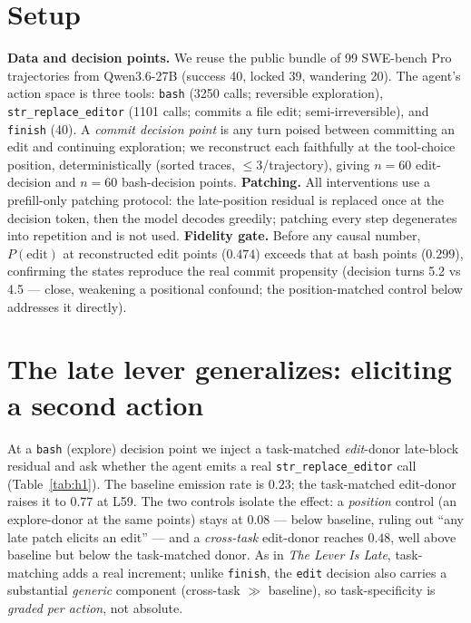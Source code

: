 \documentclass[11pt]{article}
\begin{document}
\section{Setup}\label{sec:setup}
\noindent\textbf{Data and decision points.} We reuse the public bundle of 99 SWE-bench Pro~\cite{swebench}
trajectories from Qwen3.6-27B (success 40, locked 39, wandering 20). The agent's action space is three tools:
\texttt{bash} (3250 calls; reversible exploration), \texttt{str\_replace\_editor} (1101 calls; commits a file
edit; semi-irreversible), and \texttt{finish} (40). A \emph{commit decision point} is any turn poised between
committing an edit and continuing exploration; we reconstruct each faithfully at the tool-choice position,
deterministically (sorted traces, $\le 3$/trajectory), giving $n{=}60$ edit-decision and $n{=}60$ bash-decision
points. \textbf{Patching.} All interventions use a prefill-only patching protocol: the late-position residual
is replaced once at the decision token, then the model decodes greedily; patching every step degenerates into
repetition and is not used. \textbf{Fidelity gate.} Before any causal number, $P(\text{edit})$ at reconstructed
edit points ($0.474$) exceeds that at bash points ($0.299$), confirming the states reproduce the real commit
propensity (decision turns 5.2 vs 4.5 --- close, weakening a positional confound; the position-matched control
below addresses it directly).

\section{The late lever generalizes: eliciting a second action}\label{sec:elicit}
At a \texttt{bash} (explore) decision point we inject a task-matched \emph{edit}-donor late-block residual and
ask whether the agent emits a real \texttt{str\_replace\_editor} call (Table~\ref{tab:h1}). The baseline
emission rate is $0.23$; the task-matched edit-donor raises it to $0.77$ at L59. The two controls isolate the
effect: a \emph{position} control (an explore-donor at the same points) stays at $0.08$ --- below baseline,
ruling out ``any late patch elicits an edit'' --- and a \emph{cross-task} edit-donor reaches $0.48$, well above
baseline but below the task-matched donor. As in \emph{The Lever Is Late}, task-matching adds a real increment;
unlike \texttt{finish}, the \texttt{edit} decision also carries a substantial \emph{generic} component
(cross-task $\gg$ baseline), so task-specificity is \emph{graded per action}, not absolute.
\end{document}
